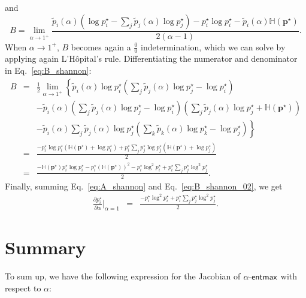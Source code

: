 and
\begin{equation}\label{eq:B_shannon}
    B = \lim_{\alpha \rightarrow 1^+} \frac{\tilde{p}_i(\alpha) (\log p_i^{\star} - \sum_j \tilde{p}_j(\alpha) \log p_j^{\star}) - p_i^{\star}\log p_i^{\star} - \tilde{p}_i(\alpha) \mathbb H(\bm{p}^{\star})}{2(\alpha-1)}.
\end{equation}
When $\alpha\rightarrow 1^+$, $B$ becomes again a $\frac{0}{0}$ indetermination, which we can solve by applying again L'H\^opital's rule. Differentiating the numerator and denominator in Eq.~\ref{eq:B_shannon}:
\begin{eqnarray}\label{eq:B_shannon_02}
    B &=& \frac{1}{2}\lim_{\alpha \rightarrow 1^+} \left\{ \tilde{p}_i(\alpha) \log p_i^{\star} \left(\sum_j \tilde{p}_j(\alpha) \log p_j^{\star} - \log p_i^{\star}\right) \right. \nonumber\\
    && - \tilde{p}_i(\alpha) \left(\sum_j \tilde{p}_j(\alpha) \log p_j^{\star} - \log p_i^{\star}\right) \left(\sum_j \tilde{p}_j(\alpha) \log p_j^{\star} + \mathbb H(\bm{p}^{\star})\right) \nonumber\\
    && \left. - \tilde{p}_i(\alpha) \sum_j \tilde{p}_j(\alpha) \log p_j^{\star} \left(\sum_k \tilde{p}_k(\alpha) \log p_k^{\star} - \log p_j^{\star}\right)\right\}\nonumber\\
    &=& \frac{-p_i^{\star} \log p_i^{\star}(\mathbb H(\bm{p}^{\star}) + \log p_i^{\star})
    +p_i^{\star} \sum_j p_j^{\star} \log p_j^{\star}(\mathbb H(\bm{p}^{\star}) + \log p_j^{\star})}{2}\nonumber\\
    &=& \frac{-\mathbb H(\bm{p}^{\star}) p_i^{\star}\log p_i^{\star} - p_i^{\star} (\mathbb H(\bm{p}^{\star}))^2 - p_i^{\star}\log^2 p_i^{\star} + p_i^{\star} \sum_j p_j^{\star}\log^2 p_j^{\star}}{2}.
\end{eqnarray}
Finally, summing Eq.~\ref{eq:A_shannon} and Eq.~\ref{eq:B_shannon_02}, we get
\begin{eqnarray}\label{eq:gradient_alpha_shannon_02}
    \frac{\partial p_i^{\star}}{\partial \alpha}\bigg|_{\alpha=1} &=& \frac{- p_i^{\star}\log^2 p_i^{\star} + p_i^{\star} \sum_j p_j^{\star}\log^2 p_j^{\star}}{2}.
\end{eqnarray}

\section*{Summary}

To sum up, we have the following expression for the Jacobian of $\mathop{\mathsf{\alpha}\textnormal{-}\mathsf{entmax}}$ with respect to $\alpha$:

